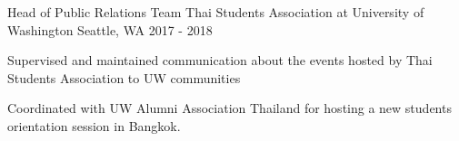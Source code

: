 

\begin{cventries}

  \cventry
    {Head of Public Relations Team} %
    {Thai Students Association at University of Washington} %
    {Seattle, WA} %
    {2017 - 2018} %
    {
      \begin{cvitems} %
        \item {Supervised and maintained communication about the events hosted by Thai Students Association to UW communities}
        \item {Coordinated with UW Alumni Association Thailand for hosting a new students orientation session in Bangkok.}
      \end{cvitems}
    }

\end{cventries}
